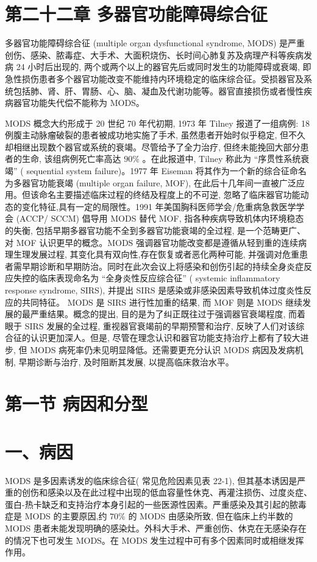 \documentclass[10pt]{article}
\begin{document}
\section*{第二十二章 多器官功能障碍综合征}
多器官功能障碍综合征 (multiple organ dysfunctional syndrome, MODS) 是严重创伤、感染、脓毒症、大手术、大面积烧伤、长时间心肺复苏及病理产科等疾病发病 24 小时后出现的, 两个或两个以上的器官先后或同时发生的功能障碍或衰竭, 即急性损伤患者多个器官功能改变不能维持内环境稳定的临床综合征。受损器官及系统包括肺、肾、肝、胃肠、心、脑、凝血及代谢功能等。器官直接损伤或者慢性疾病器官功能失代偿不能称为 MODS。

MODS 概念大约形成于 20 世纪 70 年代初期, 1973 年 Tilney 报道了一组病例: 18 例腹主动脉瘤破裂的患者被成功地实施了手术, 虽然患者开始时似乎稳定, 但不久却相继出现数个器官或系统的衰竭。尽管给予了全力治疗, 但终未能挽回大部分患者的生命, 该组病例死亡率高达 $90 \%$ 。在此报道中, Tilney 称此为 “序贯性系统衰竭” ( sequential system failure)。1977 年 Eiseman 将其作为一个新的综合征命名为多器官功能衰竭 (multiple organ failure, MOF), 在此后十几年间一直被广泛应用。但该命名主要描述临床过程的终结及程度上的不可逆, 忽略了临床器官功能动态的变化特征,具有一定的局限性。1991 年美国胸科医师学会/危重病急救医学学会 (ACCP/ SCCM) 倡导用 MODS 替代 MOF, 指各种疾病导致机体内环境稳态的失衡, 包括早期多器官功能不全到多器官功能衰竭的全过程, 是一个范畴更广、对 MOF 认识更早的概念。MODS 强调器官功能改变都是遵循从轻到重的连续病理生理发展过程, 其变化具有双向性,存在恢复或者恶化两种可能, 并强调对危重患者需早期诊断和早期防治。同时在此次会议上将感染和创伤引起的持续全身炎症反应失控的临床表现命名为 “全身炎性反应综合征” ( systemic inflammatory response syndrome, SIRS), 并提出 SIRS 是感染或非感染因素导致机体过度炎性反应的共同特征。 MODS 是 SIRS 进行性加重的结果, 而 MOF 则是 MODS 继续发展的最严重结果。概念的提出, 目的是为了纠正既往过于强调器官衰竭程度, 而着眼于 SIRS 发展的全过程, 重视器官衰竭前的早期预警和治疗, 反映了人们对该综合征的认识更加深人。但是, 尽管在理念认识和器官功能支持治疗上都有了较大进步, 但 MODS 病死率仍未见明显降低。还需要更充分认识 MODS 病因及发病机制, 早期诊断与治疗, 及时阻断其发展, 以提高临床救治水平。

\section*{第一节 病因和分型}
\section*{一、病因}
MODS 是多因素诱发的临床综合征( 常见危险因素见表 22-1), 但其基本诱因是严重的创伤和感染以及在此过程中出现的低血容量性休克、再灌注损伤、过度炎症、蛋白-热卡缺乏和支持治疗本身引起的一些医源性因素。严重感染及其引起的脓毒症是 MODS 的主要原因,约 $70 \%$ 的 MODS 由感染所致, 但在临床上约半数的 MODS 患者未能发现明确的感染灶。外科大手术、严重创伤、休克在无感染存在的情况下也可发生 MODS。在 MODS 发生过程中可有多个因素同时或相继发挥作用。
\end{document}
